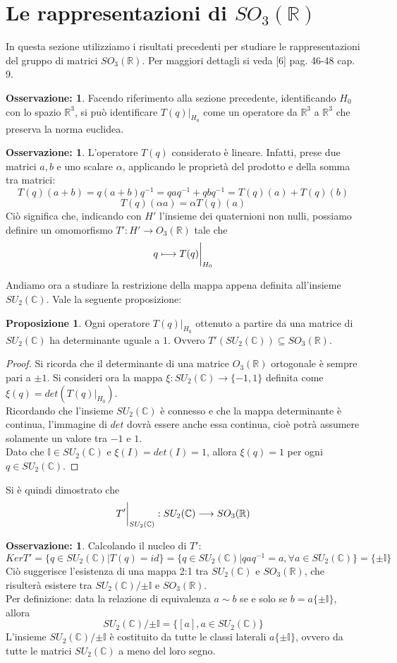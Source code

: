 \documentclass[12pt,a4paper]{report}
\theoremstyle{definition}
\theoremstyle{Theorem}
\newtheorem{Prop}[Def]{Proposizione}
\theoremstyle{definition}
\theoremstyle{definition}
\theoremstyle{definition}
\newtheorem{Obs}[Def]{Osservazione:}
\begin{document}
\section{Le rappresentazioni di $SO_3(\mathbb{R})$}
In questa sezione utilizziamo i risultati precedenti per studiare le rappresentazioni del gruppo di matrici $SO_3(\mathbb{R})$. Per maggiori dettagli si veda [6] pag. 46-48 cap. 9.
\begin{Obs}
	Facendo riferimento alla sezione precedente, identificando $H_0$ con lo spazio $\mathbb{R}^3$, si può identificare $T(q)|_{H_0}$ come un operatore da $\mathbb{R}^3$ a $\mathbb{R}^3$ che preserva la norma euclidea.
\end{Obs}
\begin{Obs}
	L'operatore $T(q)$ considerato è lineare. Infatti, prese due matrici $a,b$ e uno scalare $\alpha$, applicando le proprietà del prodotto e della somma tra matrici: $$T(q)(a+b)=q(a+b)q^{-1}=qaq^{-1}+qbq^{-1}=T(q)(a)+T(q)(b)
	$$
	$$T(q)(\alpha a)=\alpha T(q)(a)$$
	Ciò significa che, indicando con $H'$ l'insieme dei quaternioni non nulli, possiamo definire un omomorfismo $T':H'\rightarrow O_3(\mathbb{R})$ tale che
	$$q\longmapsto T(q)\bigg{\rvert}_{H_0}$$
\end{Obs}
Andiamo ora a studiare la restrizione della mappa appena definita all'insieme $SU_2(\mathbb{C})$. Vale la seguente proposizione:
\begin{Prop}
	Ogni operatore $T(q)|_{H_0}$ ottenuto a partire da una matrice di $SU_2(\mathbb{C})$ ha determinante uguale a $1$. Ovvero $T'(SU_2(\mathbb{C}))\subseteq SO_3(\mathbb{R})$. 
\end{Prop}
\begin{proof}
	Si ricorda che il determinante di una matrice $O_3(\mathbb{R})$ ortogonale è sempre pari a $\pm 1$.
	Si consideri ora la mappa $\xi:SU_2(\mathbb{C})\longrightarrow \{-1,1\}$ definita come $\xi(q)=det(T(q)|_{H_0})$.\\
	Ricordando che l'insieme $SU_2(\mathbb{C})$ è connesso e che la mappa determinante è continua, l'immagine di $det$ dovrà essere anche essa continua, cioè potrà assumere solamente un valore tra $-1$ e $1$.\\
	Dato che $\mathbb{I}\in SU_2(\mathbb{C})$ e $\xi(I)=det(I)=1$, allora $\xi(q)=1$ per ogni $q\in SU_2(\mathbb{C})$.
\end{proof}
Si è quindi dimostrato che 
$$T'\bigg{\rvert}_{SU_2(\mathbb{C})}:SU_2(\mathbb{C})\longrightarrow SO_3(\mathbb{R})$$
\begin{Obs} \label{Obs:3.2.3.1}
	Calcolando il nucleo di $T'$:$$KerT'=\{q\in SU_2(\mathbb{C})| T(q)=id\}=\{q\in SU_2(\mathbb{C})|qaq^{-1}=a, \forall a\in SU_2(\mathbb{C})\}=\{\pm\mathbb{I}\}$$
	Ciò suggerisce l'esistenza di una mappa 2:1 tra $SU_2(\mathbb{C})$ e $SO_3(\mathbb{R})$, che risulterà esistere tra $SU_2(\mathbb{C})/{\pm \mathbb{I}}$ e $SO_3(\mathbb{R})$.\\
	Per definizione: data la relazione di equivalenza $a\sim b$ se e solo se $b=a\{\pm \mathbb{I}\}$, allora
	$$SU_2(\mathbb{C})/{\pm \mathbb{I}}=\{[a], a\in SU_2(\mathbb{C})\}$$
	L'insieme $SU_2(\mathbb{C})/{\pm \mathbb{I}}$ è costituito da tutte le classi laterali $a\{\pm\mathbb{I}\}$, ovvero da tutte le matrici $SU_2(\mathbb{C})$ a meno del loro segno.
\end{Obs}
\end{document}
